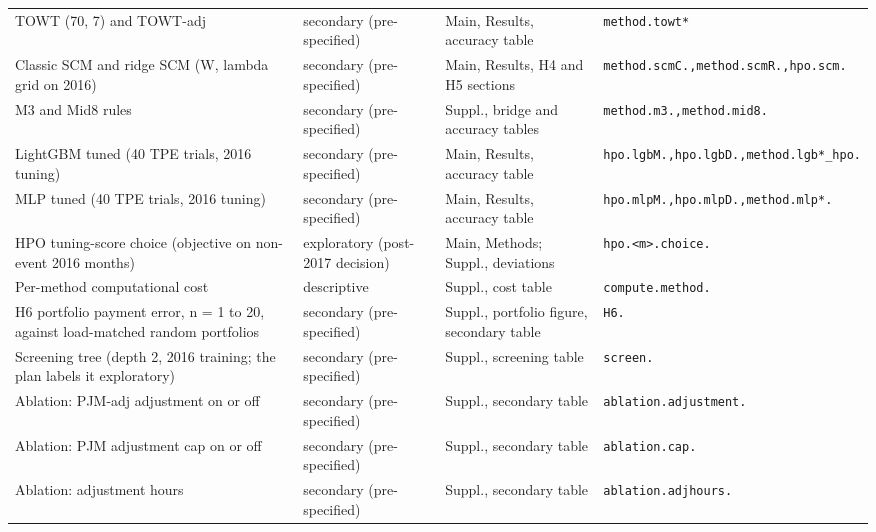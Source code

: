 {\begin{longtable}{@{}>{\raggedright\arraybackslash}p{}>{\raggedright\arraybackslash}p{}>{\raggedright\arraybackslash}p{}>{\raggedright\arraybackslash}p{}@{}}
TOWT (70, 7) and TOWT-adj & secondary (pre-specified) & Main, Results, accuracy table & \texttt{method.\allowbreak towt{*}} \\
Classic SCM and ridge SCM (W, lambda grid on 2016) & secondary (pre-specified) & Main, Results, H4 and H5 sections & \texttt{method.\allowbreak scmC.\allowbreak {*},\allowbreak  method.\allowbreak scmR.\allowbreak {*},\allowbreak  hpo.\allowbreak scm.\allowbreak {*}} \\
M3 and Mid8 rules & secondary (pre-specified) & Suppl., bridge and accuracy tables & \texttt{method.\allowbreak m3.\allowbreak {*},\allowbreak  method.\allowbreak mid8.\allowbreak {*}} \\
LightGBM tuned (40 TPE trials, 2016 tuning) & secondary (pre-specified) & Main, Results, accuracy table & \texttt{hpo.\allowbreak lgbM.\allowbreak {*},\allowbreak  hpo.\allowbreak lgbD.\allowbreak {*},\allowbreak  method.\allowbreak lgb{*}\_hpo.\allowbreak {*}} \\
MLP tuned (40 TPE trials, 2016 tuning) & secondary (pre-specified) & Main, Results, accuracy table & \texttt{hpo.\allowbreak mlpM.\allowbreak {*},\allowbreak  hpo.\allowbreak mlpD.\allowbreak {*},\allowbreak  method.\allowbreak mlp{*}.\allowbreak {*}} \\
HPO tuning-score choice (objective on non-event 2016 months) & exploratory (post-2017 decision) & Main, Methods; Suppl., deviations & \texttt{hpo.\allowbreak \textless{}m\textgreater{}.\allowbreak choice.\allowbreak {*}} \\
Per-method computational cost & descriptive & Suppl., cost table & \texttt{compute.\allowbreak method.\allowbreak {*}} \\
H6 portfolio payment error, n = 1 to 20, against load-matched random portfolios & secondary (pre-specified) & Suppl., portfolio figure, secondary table & \texttt{H6.\allowbreak {*}} \\
Screening tree (depth 2, 2016 training; the plan labels it exploratory) & secondary (pre-specified) & Suppl., screening table & \texttt{screen.\allowbreak {*}} \\
Ablation: PJM-adj adjustment on or off & secondary (pre-specified) & Suppl., secondary table & \texttt{ablation.\allowbreak adjustment.\allowbreak {*}} \\
Ablation: PJM adjustment cap on or off & secondary (pre-specified) & Suppl., secondary table & \texttt{ablation.\allowbreak cap.\allowbreak {*}} \\
Ablation: adjustment hours & secondary (pre-specified) & Suppl., secondary table & \texttt{ablation.\allowbreak adjhours.\allowbreak {*}} \\

\end{longtable}}
